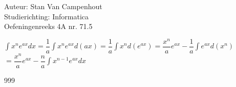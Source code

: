 \documentclass[a4paper]{article}
\begin{document}
  
\noindent \large Auteur: Stan Van Campenhout \\
\noindent \large Studierichting:  Informatica\\
\noindent \large Oefeningenreeks 4A nr. 71.5\\

\medskip

\normalsize

$ \displaystyle\int x^ne^{ax}dx = \dfrac{1}{a}\displaystyle\int x^ne^{ax}d\left(ax\right) = \dfrac{1}{a}\displaystyle\int x^nd\left(e^{ax}\right)
= \dfrac{x^n}{a}e^{ax} - \dfrac{1}{a}\displaystyle\int e^{ax}d\left(x^n\right) $\\

$ = \dfrac{x^n}{a}e^{ax}-\dfrac{n}{a}\displaystyle\int x^{n-1}e^{ax}dx $\\

\begin{thebibliography}{999}
\end{thebibliography}
\end{document}

